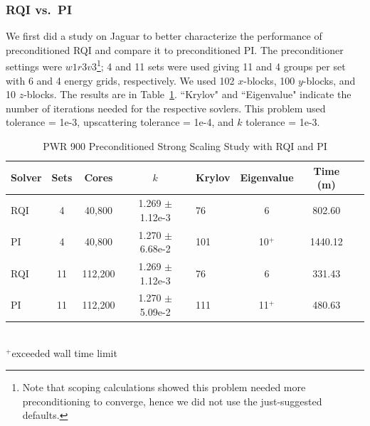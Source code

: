 \documentclass{article}                                                                           %
\begin{document}
\subsubsection{RQI vs.\ PI}
We first did a study on Jaguar \cite{jaguar2010} to better characterize the performance of preconditioned RQI and compare it to preconditioned PI. The preconditioner settings were $w1r3v3$\footnote{Note that scoping calculations showed this problem needed more preconditioning to converge, hence we did not use the just-suggested defaults.}; 4 and 11 sets were used giving 11 and 4 groups per set with 6 and 4 energy grids, respectively. We used 102 $x$-blocks, 100 $y$-blocks, and 10 $z$-blocks. The results are in Table~\ref{table:full PWR}. ``Krylov" and ``Eigenvalue" indicate the number of iterations needed for the respective sovlers. This problem used tolerance = 1e-3, upscattering tolerance = 1e-4, and $k$ tolerance = 1e-3.
%
\begin{table}[!h]
\caption{PWR 900 Preconditioned Strong Scaling Study with RQI and PI}
\begin{center}
\begin{tabular}{| l | c | c | c | l | c | c | l |}
\hline
Solver & Sets & Cores & $k$ & Krylov & Eigenvalue & Time (m) \\[0.5ex]
\hline
RQI & 4   & 40,800   & 1.269 $\pm$ 1.12e-3 & 76   &  6               & 802.60  \\
PI    & 4   & 40,800   & 1.270 $\pm$ 6.68e-2 & 101 & 10$^{+}$ & 1440.12  \\
RQI & 11 & 112,200 & 1.269 $\pm$ 1.12e-3 & 76   & 6                & 331.43    \\
PI    & 11 & 112,200 & 1.270 $\pm$ 5.09e-2 & 111 & 11$^{+}$ & 480.63     \\
\hline 
\end{tabular}\\
$^{+}$exceeded wall time limit %
\end{center}
\label{table:full PWR}
\end{table}  
\end{document}
